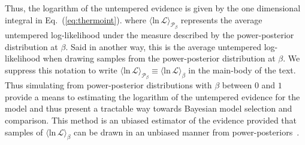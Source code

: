 Thus, the logarithm of the untempered evidence is given by the one dimensional integral in Eq.~(\ref{eq:thermoint}).
where $\langle \mathrm{ln} \, \mathcal{L} \rangle_{\mathcal{P}_\beta}$ represents the average untempered log-likelihood under the measure described by the power-posterior distribution at $\beta$. Said in another way, this is the average untempered log-likelihood when drawing samples from the power-posterior distribution at $\beta$. We suppress this notation to write $\langle \mathrm{ln} \, \mathcal{L} \rangle_{\mathcal{P}_\beta} \equiv \langle \mathrm{ln} \, \mathcal{L} \rangle_\beta$ in the main-body of the text. Thus simulating from power-posterior distributions with $\beta$ between $0$ and $1$ provide a means to estimating the logarithm of the untempered evidence for the model and thus present a tractable way towards Bayesian model selection and comparison. This method is an ubiased estimator of the evidence provided that samples of $\langle \mathrm{ln} \, \mathcal{L} \rangle_\beta$ can be drawn in an unbiased manner from power-posteriors~\citep{carlson2016partition}.

